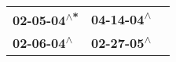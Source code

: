 \begin{supertabular}{lll}
 \textbf{02-05-04\textsuperscript{$\wedge$*}} &  \textbf{04-14-04\textsuperscript{$\wedge$}} \\
  \textbf{02-06-04\textsuperscript{$\wedge$}} &  \textbf{02-27-05\textsuperscript{$\wedge$}} \\
\end{supertabular}
